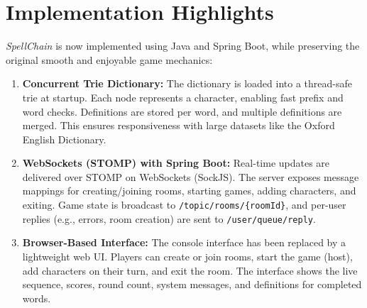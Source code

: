 \documentclass{article}
\begin{document}
\section*{Implementation Highlights}
\textit{SpellChain} is now implemented using Java and Spring Boot, while preserving the original smooth and enjoyable game mechanics:
\begin{enumerate}
    \item \textbf{Concurrent Trie Dictionary:} The dictionary is loaded into a thread-safe trie at startup. Each node represents a character, enabling fast prefix and word checks. Definitions are stored per word, and multiple definitions are merged. This ensures responsiveness with large datasets like the Oxford English Dictionary.
    \item \textbf{WebSockets (STOMP) with Spring Boot:} Real-time updates are delivered over STOMP on WebSockets (SockJS). The server exposes message mappings for creating/joining rooms, starting games, adding characters, and exiting. Game state is broadcast to \texttt{/topic/rooms/\{roomId\}}, and per-user replies (e.g., errors, room creation) are sent to \texttt{/user/queue/reply}.
    \item \textbf{Browser-Based Interface:} The console interface has been replaced by a lightweight web UI. Players can create or join rooms, start the game (host), add characters on their turn, and exit the room. The interface shows the live sequence, scores, round count, system messages, and definitions for completed words.
\end{enumerate}
\end{document}
